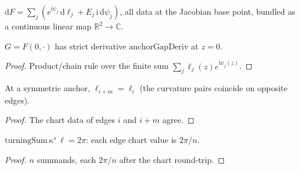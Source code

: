 \begin{definition}
  \label{def:anchor_gap_deriv}
  $\mathrm{d}F = \sum_j (e^{\mathrm{i}\psi_j}\,\mathrm{d}\ell_j + E_j\,
  \mathrm{i}\,\mathrm{d}\psi_j)$, all data at the Jacobian base point,
  bundled as a continuous linear map $\mathbb{R}^2 \to \mathbb{C}$.
\end{definition}

\begin{lemma}
  \label{lem:has_strict_fderiv_at_anchor_gap}
  $G = F(0,\cdot)$ has strict derivative $\mathrm{anchorGapDeriv}$ at
  $z = 0$.
\end{lemma}
\begin{proof}

\leanok
  Product/chain rule over the finite sum $\sum_j \ell_j(z)
  e^{\mathrm{i}\psi_j(z)}$.
\end{proof}

\begin{lemma}
  \label{lem:jacobian_base_len_symm}
  At a symmetric anchor, $\ell_{i+m} = \ell_i$ (the curvature pairs coincide
  on opposite edges).
\end{lemma}
\begin{proof}

\leanok
  The chart data of edges $i$ and $i+m$ agree.
\end{proof}

\begin{lemma}
  \label{lem:turning_sum_jacobian_base_len}
  $\mathrm{turningSum}\,\kappa^s\,\ell = 2\pi$: each edge chart value is
  $2\pi/n$.
\end{lemma}
\begin{proof}

\leanok
  $n$ summands, each $2\pi/n$ after the chart round-trip.
\end{proof}

